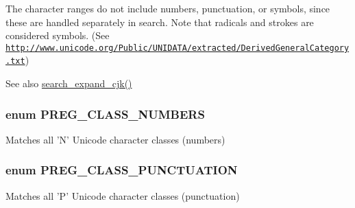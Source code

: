 The character ranges do not include numbers, punctuation, or symbols, since these are handled separately in search. Note that radicals and strokes are considered symbols. (See \href{http://www.unicode.org/Public/UNIDATA/extracted/DerivedGeneralCategory.txt}{\tt http://www.unicode.org/Public/UNIDATA/extracted/DerivedGeneralCategory.txt})

\begin{DoxySeeAlso}{See also}
\hyperlink{search_8module_a7088ffdfda833c7047b38f470a806a24}{search\_\-expand\_\-cjk()} 
\end{DoxySeeAlso}
\hypertarget{search_8module_af45ac30323578ac282a5fc1927d96305}{
\subsubsection[{PREG\_\-CLASS\_\-NUMBERS}]{\setlength{\rightskip}{0pt plus 5cm}enum {\bf PREG\_\-CLASS\_\-NUMBERS}}}
\label{search_8module_af45ac30323578ac282a5fc1927d96305}
Matches all 'N' Unicode character classes (numbers) \hypertarget{search_8module_ad6f3e596c60aa0865b379d88905a6ed5}{
\subsubsection[{PREG\_\-CLASS\_\-PUNCTUATION}]{\setlength{\rightskip}{0pt plus 5cm}enum {\bf PREG\_\-CLASS\_\-PUNCTUATION}}}
\label{search_8module_ad6f3e596c60aa0865b379d88905a6ed5}
Matches all 'P' Unicode character classes (punctuation) 

